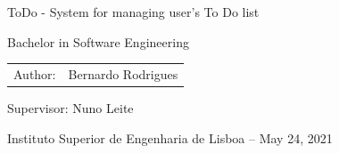 \documentclass[newPxFont,noprogressbar,table]{beamer}
\begin{document}
	
	
	
	
	\begin{frame}[t,plain]
		
		\vspace{0.5em}
		
		
		\centering
		{\LARGE ToDo - System for managing user’s To Do list}
		
		\vspace{0.5em}
		
		Bachelor in Software Engineering
		
		\vspace{0.5em}	
		
		\begin{tabular}{rl}
			Author: & Bernardo Rodrigues
		\end{tabular}
		
		\vspace{0.5em}
		
		Supervisor:  Nuno Leite 
		
		\vspace{0.5em}
		
		Instituto Superior de Engenharia de Lisboa -- May 24, 2021
		
	\end{frame}
	
\end{document}
